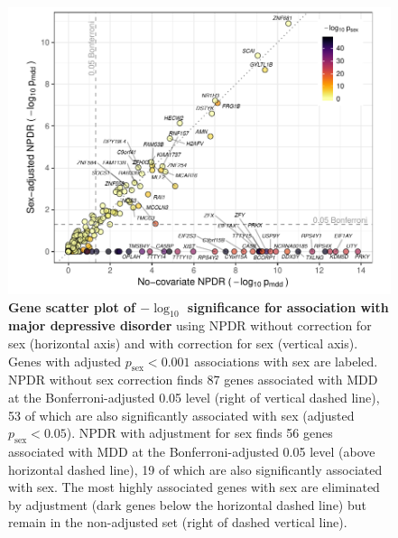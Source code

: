 \documentclass[10pt]{article}
\begin{document}
\begin{figure}[!tpb]%
\centerline{\includegraphics[]{../figs/mostafavi_npdrs_mdd.pdf}}
\caption{{\bf Gene scatter plot of $-\log_{10}$ significance for association with major depressive disorder}
using NPDR without correction for sex (horizontal axis) and with correction for sex (vertical axis). Genes with adjusted $p_\textrm{sex} < 0.001$ associations with sex are labeled. NPDR without sex correction finds 87 genes associated with MDD at the Bonferroni-adjusted 0.05 level (right of vertical dashed line), 53 of which are also significantly associated with sex (adjusted $p_\textrm{sex} < 0.05$).  NPDR with adjustment for sex finds 56 genes associated with MDD at the Bonferroni-adjusted 0.05 level (above horizontal dashed line), 19 of which are also significantly associated with sex. The most highly associated genes with sex are eliminated by adjustment (dark genes below the horizontal dashed line) but remain in the non-adjusted set (right of dashed vertical line). }
\label{fig:npdrs_mdd}
\end{figure}

% 
\end{document}
